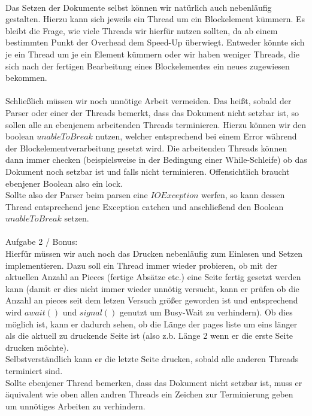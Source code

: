 \documentclass[12pt,a4paper]{scrartcl}
\numberwithin{equation}{section}
\begin{document}
\\
Das Setzen der Dokumente selbst können wir natürlich auch nebenläufig gestalten. Hierzu kann sich jeweils ein Thread um ein Blockelement kümmern. Es bleibt die Frage, wie viele Threads wir hierfür nutzen sollten, da ab einem bestimmten Punkt der Overhead dem Speed-Up überwiegt. Entweder könnte sich je ein Thread um je ein Element kümmern oder wir haben weniger Threads, die sich nach der fertigen Bearbeitung eines Blockelementes ein neues zugewiesen bekommen.\\
\\
Schließlich müssen wir noch unnötige Arbeit vermeiden. Das heißt, sobald der Parser oder einer der Threads bemerkt, dass das Dokument nicht setzbar ist, so sollen alle an ebenjenem arbeitenden Threads terminieren. Hierzu können wir den boolean $ unableToBreak $ nutzen, welcher entsprechend bei einem Error während der Blockelementverarbeitung gesetzt wird. Die arbeitenden Threads können dann immer checken (beispielsweise in der Bedingung einer While-Schleife) ob das Dokument noch setzbar ist und falls nicht terminieren. Offensichtlich braucht ebenjener Boolean also ein lock.\\
Sollte also der Parser beim parsen eine $ IOException $ werfen, so kann dessen Thread entsprechend jene Exception catchen und anschließend den Boolean $ unableToBreak $ setzen.\\\\
Aufgabe 2 / Bonus:\\
Hierfür müssen wir auch noch das Drucken nebenläufig zum Einlesen und Setzen implementieren. Dazu soll ein Thread immer wieder probieren, ob mit der aktuellen Anzahl an Pieces (fertige Absätze etc.) eine Seite fertig gesetzt werden kann (damit er dies nicht immer wieder unnötig versucht, kann er prüfen ob die Anzahl an pieces seit dem letzen Versuch größer geworden ist und entsprechend wird $ await() $ und $ signal() $ genutzt um Busy-Wait zu verhindern). Ob dies möglich ist, kann er dadurch sehen, ob die Länge der pages liste um eins länger als die aktuell zu druckende Seite ist (also z.b. Länge 2 wenn er die erste Seite drucken möchte).\\
Selbstverständlich kann er die letzte Seite drucken, sobald alle anderen Threads terminiert sind.\\
Sollte ebenjener Thread bemerken, dass das Dokument nicht setzbar ist, muss er äquivalent wie oben allen andren Threads ein Zeichen zur Terminierung geben um unnötiges Arbeiten zu verhindern.

 \newpage  %
 
\end{document}
